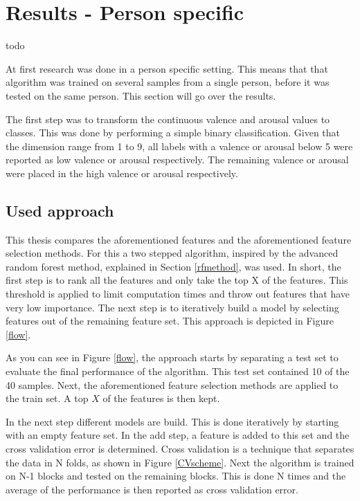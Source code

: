 \chapter{Results - Person specific}
{\samenvatting todo}

At first research was done in a person specific setting. This means that that algorithm was trained on several samples from a single person, before it was tested on the same person.
This section will go over the results.

\npar

The first step was to transform the continuous valence and arousal values to classes. This was done by performing a simple binary classification. Given that the dimension range from 1 to 9, all labels with a valence or arousal below 5 were reported as low valence or arousal respectively. The remaining valence or arousal were placed in the high valence or arousal respectively.

\section{Used approach}
\label{approach}
This thesis compares the aforementioned features and the aforementioned feature selection methods. For this a two stepped algorithm, inspired by the advanced random forest method, explained in Section \ref{rfmethod}, was used. In short, the first step is to rank all the features and only take the top X of the features. This threshold is applied to limit computation times and throw out features that have very low importance. The next step is to iteratively build a model by selecting features out of the remaining feature set. This approach is depicted in Figure \ref{flow}.


As you can see in Figure \ref{flow}, the approach starts by separating a test set to evaluate the final performance of the algorithm. This test set contained 10 of the 40 samples. Next, the aforementioned feature selection methods are applied to the train set. A top $X$ of the features is then kept.

\npar

In the next step different models are build. This is done iteratively by starting with an empty feature set. In the add step, a feature is added to this set and the cross validation error is determined. Cross validation is a technique that separates the data in N folds, as shown in Figure \ref{CVscheme}. Next the algorithm is trained on N-1 blocks and tested on the remaining blocks. This is done N times and the average of the performance is then reported as cross validation error. 

